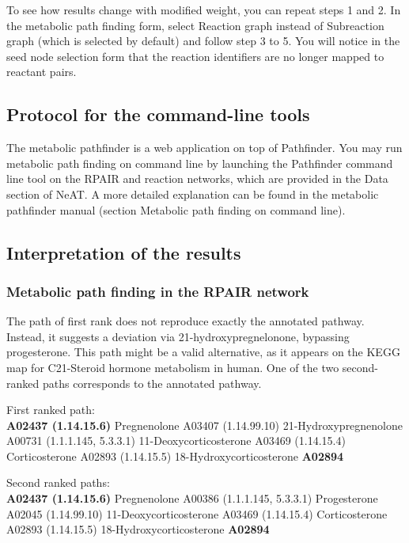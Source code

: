 To see how results change with modified weight, you can repeat steps 1 and 2.
In the metabolic path finding form, select Reaction graph instead of Subreaction graph (which is selected by default) and
follow step 3 to 5. You will notice in the seed node selection form that the reaction identifiers are no longer mapped to
reactant pairs.

\subsection{Protocol for the command-line tools}

The metabolic pathfinder is a web application on top of Pathfinder.
You may run metabolic path finding on command line by launching the Pathfinder command line tool on
the RPAIR and reaction networks, which are provided in the Data section of NeAT.
A more detailed explanation can be found in the metabolic pathfinder manual
(section Metabolic path finding on command line).\\

\subsection{Interpretation of the results}

\subsubsection{Metabolic path finding in the RPAIR network}

The path of first rank does not reproduce exactly the annotated pathway. Instead, it suggests a deviation via 21-hydroxypregnelonone,
bypassing progesterone. This path might be a valid alternative, as it appears on the KEGG map for
C21-Steroid hormone metabolism in human. One of the two second-ranked paths corresponds to the annotated pathway.

First ranked path:\\
\textbf{A02437 (1.14.15.6)} Pregnenolone A03407 (1.14.99.10) 21-Hydroxypregnenolone A00731 (1.1.1.145, 5.3.3.1) 11-Deoxycorticosterone A03469 (1.14.15.4) Corticosterone A02893 (1.14.15.5) 18-Hydroxycorticosterone \textbf{A02894}

Second ranked paths:\\
\textbf{A02437 (1.14.15.6)} Pregnenolone A00386 (1.1.1.145, 5.3.3.1) Progesterone A02045 (1.14.99.10) 11-Deoxycorticosterone A03469 (1.14.15.4) Corticosterone A02893 (1.14.15.5) 18-Hydroxycorticosterone \textbf{A02894}\\

